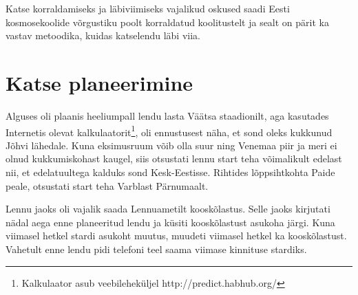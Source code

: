 \documentclass{trkut}%
\begin{document}
Katse korraldamiseks ja läbiviimiseks vajalikud oskused saadi Eesti kosmosekoolide võrgustiku poolt korraldatud koolitustelt ja sealt on pärit ka vastav metoodika, kuidas katselendu läbi viia.

\section{Katse planeerimine}
Alguses oli plaanis heeliumpall lendu lasta Väätsa staadionilt, aga kasutades Internetis olevat kalkulaatorit\footnote{Kalkulaator asub veebileheküljel http://predict.habhub.org/}, oli ennustusest näha, et sond oleks kukkunud Jõhvi lähedale. Kuna eksimusruum võib olla suur ning Venemaa piir ja meri ei olnud kukkumiskohast kaugel, siis otsustati lennu start teha võimalikult edelast nii, et edelatuultega kalduks sond Kesk-Eestisse. Rihtides lõppsihtkohta Paide peale, otsustati start teha Varblast Pärnumaalt.

Lennu jaoks oli vajalik saada Lennuametilt kooskõlastus. Selle jaoks kirjutati nädal aega enne planeeritud lendu ja küsiti kooskõlastust asukoha järgi. Kuna viimasel hetkel stardi asukoht muutus, muudeti viimasel hetkel ka kooskõlastust. Vahetult enne lendu pidi telefoni teel saama viimase kinnituse stardiks.
\end{document}
